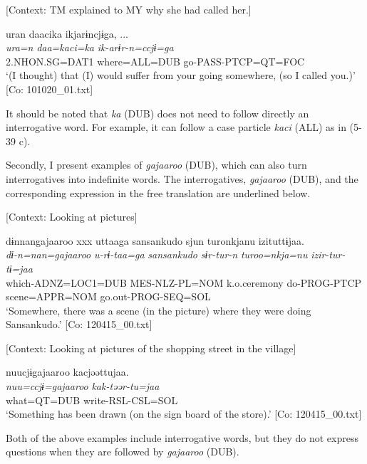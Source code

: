  \ex \label{ex:5:39c} [Context: TM explained to MY why she had called her.]

\glll  uran  daacika  ikjarɨncjɨga, ...\\
\textit{ura=n}  \textit{daa=kaci=ka}  \textit{ik-arɨr-n=ccjɨ=ga}\\
2.NHON.SG=DAT1  where=ALL=DUB  go-PASS-PTCP=QT=FOC\\
\glt ‘(I thought) that (I) would suffer from your going somewhere, (so I called you.)’ [Co: 101020\_01.txt]
\z
\z

It should be noted that \textit{ka} (DUB) does not need to follow directly an interrogative word. For example, it can follow a case particle \textit{kaci} (ALL) as in (5-39 c).

  Secondly, I present examples of \textit{gajaaroo} (DUB), which can also turn interrogatives into indefinite words. The interrogatives, \textit{gajaaroo} (DUB), and the corresponding expression in the free translation are underlined below.

\ea \label{ex:5:40}  \ea \label{ex:5:40a} [Context: Looking at pictures]

\glll  dɨnnangajaaroo  xxx  uttaaga  {\textbar}sansankudo{\textbar}   sjun  turonkjanu  izituttɨjaa.\footnotemark\\
\textit{dɨ-n=nan=gajaaroo}    \textit{u-rɨ-taa=ga}  \textit{sansankudo}   \textit{sɨr-tur-n}  \textit{turoo=nkja=nu}  \textit{izir-tur-tɨ=jaa}\\
which-ADNZ=LOC1=DUB    MES-NLZ-PL=NOM  k.o.ceremony   do-PROG-PTCP  scene=APPR=NOM  go.out-PROG-SEQ=SOL      \\
\glt ‘Somewhere, there was a scene (in the picture) where they were doing Sansankudo.’ [Co: 120415\_00.txt]

 \ex \label{ex:5:b} [Context: Looking at pictures of the shopping street in the village]

\glll  nuucjɨgajaaroo  kacjəəttujaa.\\
\textit{nuu=ccjɨ=gajaaroo}  \textit{kak-təər-tu=jaa}\\
what=QT=DUB  write-RSL-CSL=SOL\\
\glt ‘Something has been drawn (on the sign board of the store).’ [Co: 120415\_00.txt]
\z
\z

Both of the above examples include interrogative words, but they do not express questions when they are followed by \textit{gajaaroo} (DUB).

